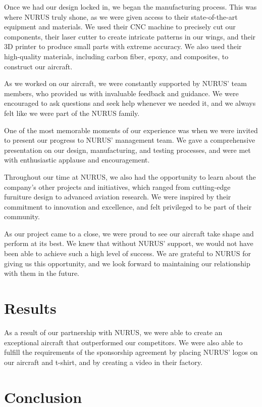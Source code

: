 \documentclass{article}
\begin{document}
Once we had our design locked in, we began the manufacturing process. This was where NURUS truly shone, as we were given access to their state-of-the-art equipment and materials. We used their CNC machine to precisely cut our components, their laser cutter to create intricate patterns in our wings, and their 3D printer to produce small parts with extreme accuracy. We also used their high-quality materials, including carbon fiber, epoxy, and composites, to construct our aircraft.

As we worked on our aircraft, we were constantly supported by NURUS' team members, who provided us with invaluable feedback and guidance. We were encouraged to ask questions and seek help whenever we needed it, and we always felt like we were part of the NURUS family.

One of the most memorable moments of our experience was when we were invited to present our progress to NURUS' management team. We gave a comprehensive presentation on our design, manufacturing, and testing processes, and were met with enthusiastic applause and encouragement.

Throughout our time at NURUS, we also had the opportunity to learn about the company's other projects and initiatives, which ranged from cutting-edge furniture design to advanced aviation research. We were inspired by their commitment to innovation and excellence, and felt privileged to be part of their community.

As our project came to a close, we were proud to see our aircraft take shape and perform at its best. We knew that without NURUS' support, we would not have been able to achieve such a high level of success. We are grateful to NURUS for giving us this opportunity, and we look forward to maintaining our relationship with them in the future.

\section{Results}

As a result of our partnership with NURUS, we were able to create an exceptional aircraft that outperformed our competitors. We were also able to fulfill the requirements of the sponsorship agreement by placing NURUS' logos on our aircraft and t-shirt, and by creating a video in their factory.


\section{Conclusion}
\end{document}
